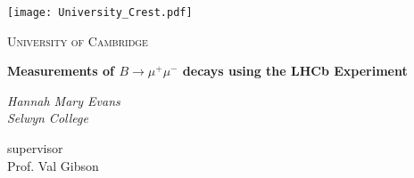 \begin{titlepage}
  \centering
  \texttt{[image: University\_Crest.pdf]}\par\vspace{1cm}
  {\scshape\LARGE  University of Cambridge \par}
  \vspace{1cm}
  \vspace{1.5cm}
  {\LARGE\bfseries Measurements of $B \to \mu^{+} \mu^{-}$ decays using the LHCb Experiment \par}
  \vspace{2cm}
  {\Large\itshape Hannah Mary Evans\\
    Selwyn College\par}
  \vfill
  {\large
  supervisor  \\
  Prof. Val Gibson
  }
  \vfill

  {\large }
\end{titlepage}
